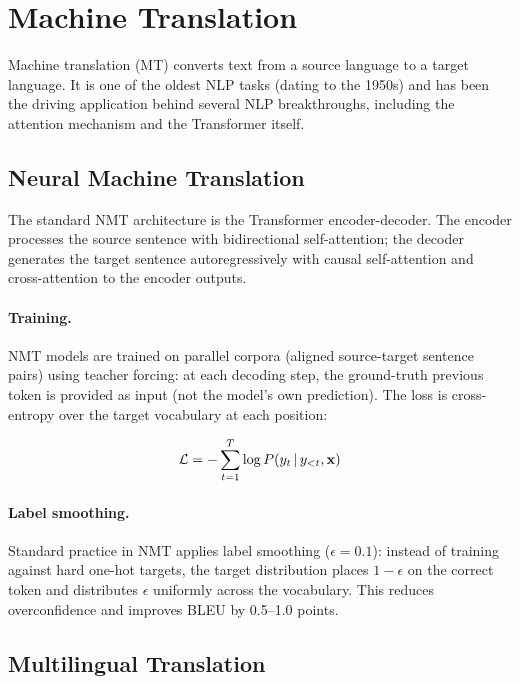 \section{Machine Translation}
\label{sec:machine_translation}

Machine translation (MT) converts text from a source language to a target language.  It is one
of the oldest NLP tasks (dating to the 1950s) and has been the driving application behind
several NLP breakthroughs, including the attention mechanism and the Transformer itself.

\subsection{Neural Machine Translation}

The standard NMT architecture is the Transformer encoder-decoder.  The encoder processes the
source sentence with bidirectional self-attention; the decoder generates the target sentence
autoregressively with causal self-attention and cross-attention to the encoder outputs.

\paragraph{Training.}
NMT models are trained on parallel corpora (aligned source-target sentence pairs) using
teacher forcing: at each decoding step, the ground-truth previous token is provided as input
(not the model's own prediction).  The loss is cross-entropy over the target vocabulary at
each position:

\[
    \mathcal{L} = -\sum_{t=1}^{T} \log P(y_t \,|\, y_{<t}, \mathbf{x})
\]

\paragraph{Label smoothing.}
Standard practice in NMT applies label smoothing ($\epsilon = 0.1$): instead of training
against hard one-hot targets, the target distribution places $1 - \epsilon$ on the correct
token and distributes $\epsilon$ uniformly across the vocabulary.  This reduces overconfidence
and improves BLEU by 0.5--1.0 points.

\subsection{Multilingual Translation}


